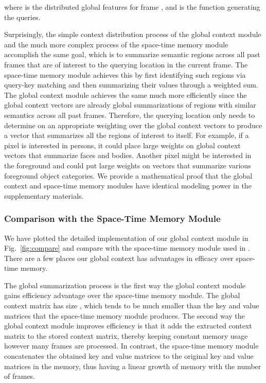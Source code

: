 \documentclass[runningheads]{llncs}
\begin{document}
where  is the distributed global features for frame , and  is the function generating the queries.

Surprisingly, the simple context distribution process of the global context module and the much more complex process of the space-time memory module accomplish the same goal, which is to summarize semantic regions across all past frames that are of interest to the querying location in the current frame. The space-time memory module achieves this by first identifying such regions via query-key matching and then summarizing their values through a weighted sum. The global context module achieves the same much more efficiently since the global context vectors are already global summarizations of regions with similar semantics across all past frames. Therefore, the querying location only needs to determine on an appropriate weighting over the global context vectors to produce a vector that summarizes all the regions of interest to itself. For example, if a pixel is interested in persons, it could place large weights on global context vectors that summarize faces and bodies. Another pixel might be interested in the foreground and could put large weights on vectors that summarize various foreground object categories. We provide a mathematical proof that the global context and space-time memory modules have identical modeling power in the supplementary materials.

\subsubsection{Comparison with the Space-Time Memory Module}

We have plotted the detailed implementation of our global context module in Fig.~\ref{fig:compare} and compare with the space-time memory module used in \cite{stm}. There are a few places our global context has advantages in efficacy over space-time memory.

The global summarization process is the first way the global context module gains efficiency advantage over the space-time memory module. The global context matrix has size , which tends to be much smaller than the 
key and  value matrices that the space-time memory module produces. The second way the global context module improves efficiency is that it adds the extracted context matrix to the stored context matrix, thereby keeping constant memory usage however many frames are processed. In contrast, the space-time memory module concatenates the obtained key and value matrices to the original key and value matrices in the memory, thus having a linear growth of memory with the number of frames.
\end{document}
